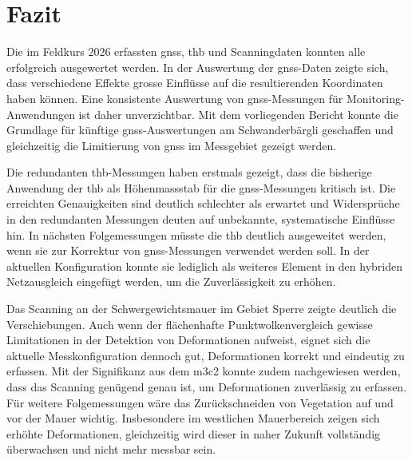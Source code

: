 \section{Fazit}
\label{sec:fazit}
Die im Feldkurs 2026 erfassten \gls{gnss}, \gls{thb} und Scanningdaten konnten alle erfolgreich ausgewertet werden. 
In der Auswertung der \acrshort{gnss}-Daten zeigte sich, dass verschiedene Effekte grosse Einflüsse auf die resultierenden 
Koordinaten haben können. Eine konsistente Auswertung von \acrshort{gnss}-Messungen für Monitoring-Anwendungen ist daher 
unverzichtbar. Mit dem vorliegenden Bericht konnte die Grundlage für künftige \acrshort{gnss}-Auswertungen am Schwanderbärgli geschaffen 
und gleichzeitig die Limitierung von \gls{gnss} im Messgebiet gezeigt werden.

Die redundanten \acrshort{thb}-Messungen haben erstmals gezeigt, dass die bisherige Anwendung der \gls{thb} als Höhenmassstab für 
die \acrshort{gnss}-Messungen kritisch ist. Die erreichten Genauigkeiten sind deutlich schlechter als erwartet und Widersprüche 
in den redundanten Messungen deuten auf unbekannte, systematische Einflüsse hin. In nächsten Folgemessungen müsste die \gls{thb} 
deutlich ausgeweitet werden, wenn sie zur Korrektur von \acrshort{gnss}-Messungen verwendet werden soll. In der aktuellen Konfiguration 
konnte sie lediglich als weiteres Element in den hybriden Netzausgleich eingefügt werden, um die Zuverlässigkeit zu erhöhen. 

Das Scanning an der Schwergewichtsmauer im Gebiet Sperre zeigte deutlich die Verschiebungen. Auch wenn der 
flächenhafte Punktwolkenvergleich gewisse Limitationen in der Detektion von Deformationen aufweist, eignet 
sich die aktuelle Messkonfiguration dennoch gut, Deformationen korrekt und eindeutig zu erfassen. Mit der 
Signifikanz aus dem \gls{m3c2} konnte zudem nachgewiesen werden, dass das Scanning genügend genau ist, um Deformationen 
zuverlässig zu erfassen. Für weitere Folgemessungen wäre das Zurückschneiden von Vegetation auf und vor der Mauer 
wichtig. Insbesondere im westlichen Mauerbereich zeigen sich erhöhte Deformationen, gleichzeitig wird dieser in naher 
Zukunft vollständig überwachsen und nicht mehr messbar sein.

